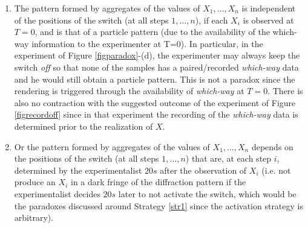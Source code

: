 \documentclass[11pt]{article}
\theoremstyle{definition}
\begin{document}
\begin{enumerate}
\item The pattern formed by aggregates of the values of $X_1,\ldots,X_n$ is independent of the positions of the switch (at all steps $1,\ldots,n$), if each $X_i$ is observed at $T=0$, and is that of a particle pattern (due to the availability of the which-way information to the experimenter at T=0). In particular, in the experiment of  Figure \ref{figparadox}-(d), the experimenter may always keep the switch \emph{off} so that none of the samples has a paired/recorded \emph{which-way} data and he would still obtain a particle pattern. This is not a paradox since the rendering is triggered through the availability of \emph{which-way} at $T=0$.
There is also no contraction with the suggested outcome of the experiment of Figure \ref{figrecordoff} since in
that experiment  the recording of the \emph{which-way} data is determined prior to the realization of $X$.
\item Or the pattern formed by aggregates of the values of $X_1,\ldots,X_n$ depends on the positions of the switch (at all steps $1,\ldots,n$) that are, at each step $i$, determined by the experimentalist $20s$ after the observation of $X_i$ (i.e. not produce an $X_i$ in a dark fringe of the diffraction pattern if the experimentalist decides $20s$ later to not activate the switch, which would be the paradoxes discussed around Strategy \ref{str1} since the activation strategy is arbitrary).
\end{enumerate}
\end{document}
